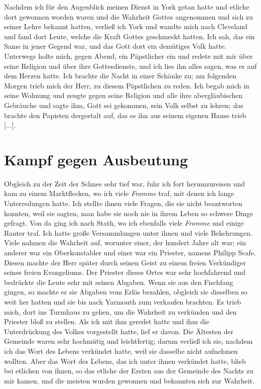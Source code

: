 Nachdem ich für den Augenblick meinen Dienst in York getan
hatte und etliche dort gewonnen worden waren und die Wahrheit
Gottes angenommen und sich zu seiner Lehre bekannt hatten,
verließ ich York und wandte mich nach 
Cleveland und fand dort
Leute, welche die Kraft Gottes geschmeckt hatten. Ich sah, das
ein Same in jener Gegend war, und das Gott dort ein demütiges
Volk hatte. Unterwegs holte mich, gegen Abend, ein Päpstlicher
ein und redete mit mir über seine Religion und über ihre 
Gottesdienste, und ich lies ihn alles sagen, was er auf dem Herzen
hatte. Ich brachte die Nacht in einer Schänke zu; am folgenden
Morgen trieb mich der Herr, zu diesem 
Päpstlichen zu reden. Ich
begab mich in seine Wohnung und zeugte gegen seine Religion
und alle ihre abergläubischen Gebräuche und sagte ihm, Gott sei
gekommen, sein Volk selbst zu lehren; das brachte den Papisten
dergestalt auf, das es ihn aus seinem eigenen Hause trieb [...].

\section{Kampf gegen Ausbeutung}

Obgleich zu der Zeit der Schnee sehr tief war, fuhr ich fort
herumzureisen und kam zu einem Marktflecken, wo ich viele
\textit{Fromme} traf, mit denen ich lange Unterredungen hatte. Ich
stellte ihnen viele Fragen, die sie nicht beantworten konnten, weil
sie sagten, man habe sie noch nie in ihrem Leben so schwere
Dinge gefragt. Von da ging ich nach Stath, wo ich ebenfalls
viele \textit{Fromme} und einige Ranter traf. 
Ich hatte große Versammlungen unter ihnen und viele Bekehrungen. 
Viele nahmen die Wahrheit auf, worunter einer, der hundert 
Jahre alt war; ein
anderer war ein Oberkonstabler und einer war ein Priester, namens
Philipp Scafe. Diesen machte der Herr 
später durch seinen Geist
zu einem freien Verkündiger seines freien Evangeliums.
Der Priester dieses Ortes war sehr hochfahrend und bedrückte
die Leute sehr mit seinen Abgaben. 
Wenn sie aus den Fischfang
gingen, so machte er sie Abgaben vom Erlös bezahlen, obgleich
sie dieselben so weit her hatten und sie bis nach Yarmouth zum
verkaufen brachten. Es trieb mich, dort ins Turmhaus zu gehen,
um die Wahrheit zu verkünden und den Priester 
bloß zu stellen.
Als ich mit ihm geredet hatte und ihm die Unterdrückung des
Volkes vorgestellt hatte, lief er davon. Die Ältesten der Gemeinde
waren sehr hochmütig und leichtfertig; darum verließ ich sie, 
nachdem ich das Wort des Lebens verkündet hatte, weil sie dasselbe
nicht aufnehmen wollten. Aber das Wort des Lebens, das ich
unter ihnen verkündet hatte, blieb bei etlichen von ihnen, so das
etliche der Ersten aus der Gemeinde des Nachts zu mir kamen,
und die meisten wurden gewonnen und bekannten sich zur Wahrheit.



